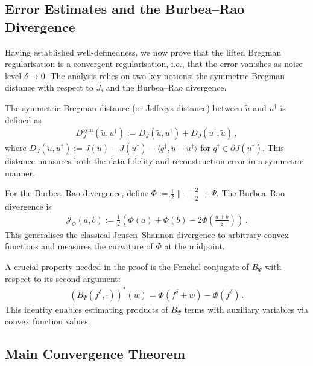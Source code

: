 \subsection{Error Estimates and the Burbea--Rao Divergence}

Having established well-definedness, we now prove that the lifted Bregman regularisation is a convergent regularisation, i.e., that the error vanishes as noise level $\delta \to 0$. The analysis relies on two key notions: the symmetric Bregman distance with respect to $J$, and the Burbea--Rao divergence.

The symmetric Bregman distance (or Jeffreys distance) between $\tilde{u}$ and $u^\dagger$ is defined as
\begin{align*}
    D_J^{\mathrm{sym}}(\tilde{u}, u^\dagger) := D_J(\tilde{u}, u^\dagger) + D_J(u^\dagger, \tilde{u}) \, ,
\end{align*}
where $D_J(\tilde{u}, u^\dagger) := J(\tilde{u}) - J(u^\dagger) - \langle q^\dagger, \tilde{u} - u^\dagger \rangle$ for $q^\dagger \in \partial J(u^\dagger)$. This distance measures both the data fidelity and reconstruction error in a symmetric manner.

For the Burbea--Rao divergence, define $\Phi := \frac{1}{2}\|\cdot\|_2^2 + \Psi$. The Burbea--Rao divergence is
\begin{align}\label{eq:jensen_shannon_app}
    \mathcal{J}_{\Phi}(a, b) := \frac{1}{2} \left( \Phi(a) + \Phi(b) - 2 \Phi\left( \frac{a + b}{2} \right) \right) \, .
\end{align}
This generalises the classical Jensen--Shannon divergence to arbitrary convex functions and measures the curvature of $\Phi$ at the midpoint.

A crucial property needed in the proof is the Fenchel conjugate of $B_\Psi$ with respect to its second argument:
\begin{align*}
    \left(B_\Psi(f^\delta, \cdot)\right)^*(w) = \Phi(f^\delta + w) - \Phi(f^\delta) \, .
\end{align*}
This identity enables estimating products of $B_\Psi$ terms with auxiliary variables via convex function values.

\subsection{Main Convergence Theorem}

